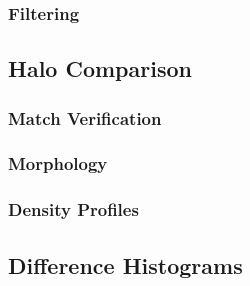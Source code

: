 \subsubsection{Filtering}
\label{subsubsec:analysis--catalogue--filtering}




\subsection{Halo Comparison}
\label{subsec:analysis--halo_comparison}



\subsubsection{Match Verification}
\label{subsubsec:analysis--halo_comparison--match_verification}



\subsubsection{Morphology}
\label{subsubsec:analysis--halo_comparison--morphology}



\subsubsection{Density Profiles}
\label{subsubsec:analysis--halo_comparison--density_profiles}




\subsection{Difference Histograms}
\label{subsec:analysis--difference_histograms}



